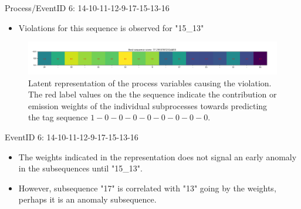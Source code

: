 \documentclass{beamer}
\begin{document}
\begin{frame} %
\begin{block}{Process/EventID 6: 14-10-11-12-9-17-15-13-16}
		\begin{itemize}
                \scriptsize
				\item Violations for this sequence is observed for "15\_13"
			\end{itemize}
\end{block}
\begin{figure}[!h]
            \includegraphics[scale = .23]{item_seven.png}
            \centering
            \caption{\scriptsize Latent representation of the process variables causing the violation.  The red label values on the the sequence indicate the contribution or emission weights of the individual subprocesses towards predicting the tag sequence $1-0-0-0-0-0-0-0-0$.}
            \label{fig4}
\end{figure}
\begin{block}{EventID 6: 14-10-11-12-9-17-15-13-16}
		\begin{itemize}
            \scriptsize
			\item The weights indicated in the representation does not signal an early anomaly in the subsequences until "15\_13". 
            \item However, subsequence "17" is correlated with "13" going by the weights, perhaps it is an anomaly subsequence.
			\end{itemize}
\end{block}
\end{frame}




\setlength{\abovedisplayskip}{8pt}
\setlength{\belowdisplayskip}{8pt}


\end{document}

